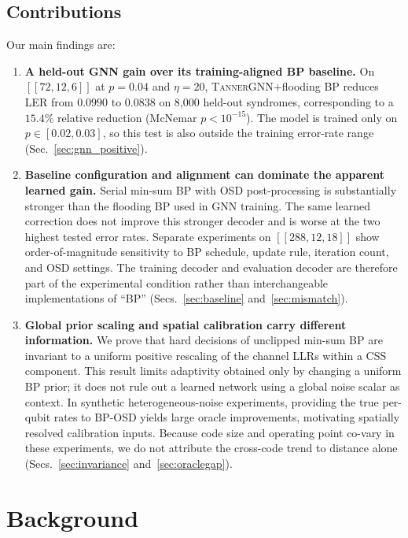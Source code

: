 \documentclass[a4paper,twocolumn,11pt,nopdfoutputerror]{quantumarticle}
\newcommand{\code}[3]{\ensuremath{[\![#1,#2,#3]\!]}}
\begin{document}
\subsection{Contributions}\label{sec:contributions}

Our main findings are:
\begin{enumerate}[leftmargin=*,topsep=3pt,itemsep=3pt]
\item \textbf{A held-out GNN gain over its training-aligned BP baseline.}
On $\code{72}{12}{6}$ at $p=0.04$ and $\eta=20$,
\textsc{TannerGNN}+flooding BP reduces LER from $0.0990$ to $0.0838$
on 8{,}000 held-out syndromes, corresponding to a $15.4\%$ relative
reduction (McNemar $p<10^{-15}$). The model is trained only on
$p\in[0.02,0.03]$, so this test is also outside the training error-rate
range (Sec.~\ref{sec:gnn_positive}).

\item \textbf{Baseline configuration and alignment can dominate the
apparent learned gain.} Serial min-sum BP with OSD post-processing is
substantially stronger than the flooding BP used in GNN training. The
same learned correction does not improve this stronger decoder and is
worse at the two highest tested error rates. Separate experiments on
$\code{288}{12}{18}$ show order-of-magnitude sensitivity to BP schedule,
update rule, iteration count, and OSD settings. The
training decoder and evaluation decoder are therefore part of the
experimental condition rather than interchangeable implementations of
``BP''
(Secs.~\ref{sec:baseline} and~\ref{sec:mismatch}).

\item \textbf{Global prior scaling and spatial calibration carry
different information.} We prove that hard decisions of unclipped
min-sum BP are invariant to a uniform positive rescaling of the channel
LLRs within a CSS component. This result limits adaptivity obtained only
by changing a uniform BP prior; it does not rule out a learned network
using a global noise scalar as context. In synthetic heterogeneous-noise
experiments, providing the true per-qubit rates to BP-OSD yields large
oracle improvements, motivating spatially resolved calibration inputs.
Because code size and operating point co-vary in these experiments, we do
not attribute the cross-code trend to distance alone
(Secs.~\ref{sec:invariance} and~\ref{sec:oraclegap}).
\end{enumerate}
\section{Background}\label{sec:background}
\end{document}
